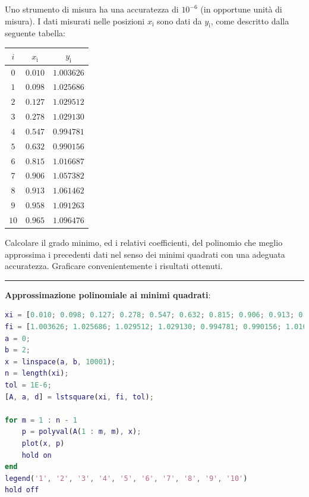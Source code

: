 Uno strumento di misura ha una accuratezza di $10^{-6}$ (in opportune unità di misura). I dati misurati nelle posizioni $x_\mathrm{i}$ sono dati da $y_\mathrm{i}$, come descritto
dalla seguente tabella:
\begin{table}[H]
	\centering
	\begin{tabular}{|c|c|c|}
		\hline
		$i$ & $x_\mathrm{i}$ & $y_\mathrm{i}$ \\
		\hline
		$0$ & $0.010$ & $1.003626$ \\
		$1$ & $0.098$ & $1.025686$ \\
		$2$ & $0.127$ & $1.029512$ \\
		$3$ & $0.278$ & $1.029130$ \\
		$4$ & $0.547$ & $0.994781$ \\
		$5$ & $0.632$ & $0.990156$ \\
		$6$ & $0.815$ & $1.016687$ \\
		$7$ & $0.906$ & $1.057382$ \\
		$8$ & $0.913$ & $1.061462$ \\
		$9$ & $0.958$ & $1.091263$ \\
		$10$ & $0.965$ & $1.096476$ \\
		\hline
	\end{tabular}
\end{table}
Calcolare il grado minimo, ed i relativi coefficienti, del polinomio che meglio approssima i precedenti dati nel senso dei minimi quadrati con una adeguata accuratezza.
Graficare convenientemente i risultati ottenuti.

\hspace*{\fill}
\par\noindent\rule{\textwidth}{0.4pt}
\hspace*{\fill}

\textbf{Approssimazione polinomiale ai minimi quadrati}:


\begin{lstlisting}[language=Matlab, caption=Codice Matlab]
xi = [0.010; 0.098; 0.127; 0.278; 0.547; 0.632; 0.815; 0.906; 0.913; 0.958; 0.965];
fi = [1.003626; 1.025686; 1.029512; 1.029130; 0.994781; 0.990156; 1.016687; 1.057382; 1.061462; 1.091263; 1.096476];
a = 0;
b = 2;
x = linspace(a, b, 10001);
n = length(xi);
tol = 1E-6;
[A, a, d] = lstsquare(xi, fi, tol);

for m = 1 : n - 1
	p = polyval(A(1 : m, m), x);
	plot(x, p)
	hold on
end
legend('1', '2', '3', '4', '5', '6', '7', '8', '9', '10')
hold off
\end{lstlisting}

